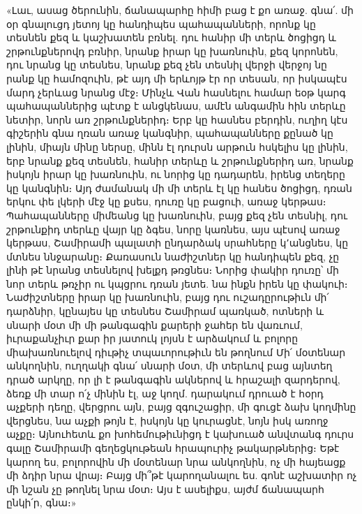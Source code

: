 \documentclass{article}
\begin{document}
{«Լաւ, ասաց ծերունին, ճանապարհը հիմի բաց է քո առաջ. գնա՛. մի օր գնալուցդ յետոյ կը հանդիպես պահապանների, որոնք կը տեսնեն քեզ և կաշխատեն բռնել. դու հանիր մի տերև ծոցիցդ և շրթունքներովդ բռնիր, նրանք իրար կը խառնուին, քեզ կորոնեն, դու նրանց կը տեսնես, նրանք քեզ չեն տեսնիլ վերջի վերջոյ նը րանք կը համոզուին, թէ այդ մի երևոյթ էր որ տեսան, որ իսկապէս մարդ չերևաց նրանց մէջ։ Մինչև Վան հասնելու համար եօթ կարգ պահապաններից պէտք է անցկենաս, ամէն անգամին հին տերևը նետիր, նորն առ շրթունքներիդ։ Երբ կը հասնես բերդին, ուղիղ կէս գիշերին գնա ղռան առաջ կանգնիր, պահապանները քընած կը լինին, միայն մինը ներսը, մինն էլ դուրսն արթուն հսկելիս կը լինին, երբ նրանք քեզ տեսնեն, հանիր տերևը և շրթունքներիդ առ, նրանք իսկոյն իրար կը խառնուին, ու նորից կը դադարեն, իրենց տեղերը կը կանգնին։ Այդ ժամանակ մի մի տերև էլ կը հանես ծոցիցդ, դռան երկու փե լկերի մէջ կը քսես, դուռը կը բացուի, առաջ կերթաս։ Պահապանները միմեանց կը խառնուին, բայց քեզ չեն տեսնիլ, դու շրթունքիդ տերևը վայր կը ձգես, նորը կառնես, այս պէսով առաջ կերթաս, Շամիրամի պալատի ընդարձակ սրահները կ՚անցնես, կը մտնես ննջարանը։ Քառասուն նաժիշտներ կը հանդիպեն քեզ, չը լինի թէ նրանց տեսնելով խելքդ թռցնես։ Նորից փակիր դուռը՝ մի նոր տերև թռչիր ու կպցրու դռան յետե. նա ինքն իրեն կը փակուի։ Նաժիշտները իրար կը խառնուին, բայց դու ուշադըրութիւն մի՛ դարձնիր, կընայես կը տեսնես Շամիրամ պառկած, ոտների և սնարի մօտ մի մի թանգագին քարերի ջահեր են վառւում, իւրաքանչիւր քար իր յատուկ լոյսն է արձակում և բոլորը միախառնուելով դիւթիչ տպաւորութիւն են թողնում Մի՛ մօտենար անկողնին, ուղղակի գնա՛ սնարի մօտ, մի տերևով բաց այնտեղ դրած արկղը, որ լի է թանգագին ակներով և հրաշալի զարդերով, ձեռք մի տար ո՛չ մինին էլ, աջ կողմ. դարակում դրուած է հօրդ աչքերի դեղը, վերցրու այն, բայց զգուշացիր, մի գուցէ ձախ կողմինը վերցնես, նա աչքի թոյն է, իսկոյն կը կուրացնէ, նոյն իսկ առողջ աչքը։ Այնուհետև քո խոհեմութիւնիցդ է կախուած անվտանգ դուրս գալը Շամիրամի գեղեցկութեան հրապուրիչ թակարթներից։ Եթէ կարող ես, բոլորովին մի մօտենար նրա անկողնին, ոչ մի հայեացք մի ձդիր նրա վրայ։ Բայց մի՞թէ կարողանալու ես. գոնէ աշխատիր ոչ մի նշան չը թողնել նրա մօտ։ Այս է ասելիքս, այժմ ճանապարհ ընկի՛ր, գնա։»}
\clearpage
\section{}
\end{document}
